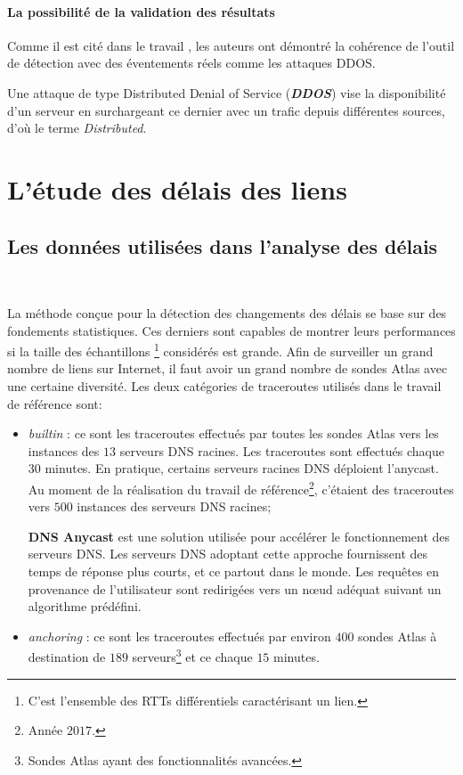 \paragraph{La possibilité de la validation des résultats}  Comme il est cité dans le travail \cite{DBLP:journals/corr/FontugneAPB16}, les auteurs ont démontré la cohérence de l'outil de détection avec des éventements réels comme les  attaques DDOS.
	
	\begin{tcolorbox}
		Une attaque de type Distributed Denial of Service (\textbf{\textit{DDOS}}) vise la disponibilité d'un serveur en surchargeant ce dernier avec un trafic depuis différentes sources, d'où le terme \textit{Distributed}.
	\end{tcolorbox}
	

\section{L'étude des délais des liens } 

\subsection{Les données utilisées dans l'analyse des délais}~

La méthode conçue pour la détection des changements des délais se base sur des fondements statistiques. Ces derniers sont capables de montrer leurs performances si la taille des échantillons \footnote{C'est l'ensemble des RTTs différentiels caractérisant un lien.} considérés est grande.   Afin de surveiller un grand nombre de liens sur Internet, il faut avoir un grand nombre de sondes Atlas avec une certaine diversité.  Les   deux catégories de traceroutes  utilisés dans le travail de référence  sont:


\begin{itemize}
	\item \textit{builtin} : ce sont les traceroutes effectués par toutes les sondes Atlas vers les instances des  $13$ serveurs DNS racines. Les traceroutes sont effectués chaque $30$ minutes. En pratique, certains serveurs racines DNS déploient l'anycast. Au moment de la réalisation du travail de référence\footnote{Année $2017$.}, c'étaient des traceroutes vers $ 500 $ instances des serveurs DNS racines;
	\begin{tcolorbox}
		\textbf{DNS Anycast} est une solution   utilisée pour accélérer le fonctionnement  des serveurs DNS. Les serveurs DNS adoptant cette approche fournissent des temps de réponse plus courts, et ce partout dans le monde. Les requêtes en provenance de l'utilisateur sont redirigées vers un n\oe{}ud adéquat suivant un algorithme prédéfini. 
	\end{tcolorbox}
	
	\item \textit{anchoring} : ce sont les traceroutes effectués par environ $400$ sondes Atlas à destination de $189$ serveurs\footnote{Sondes Atlas ayant des fonctionnalités avancées.} et ce chaque $15$ minutes.
\end{itemize}

